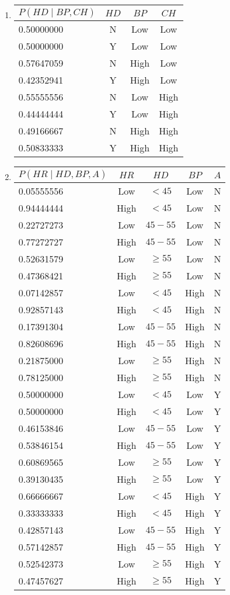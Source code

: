\documentclass[12pt]{article}
\begin{document}
\begin{enumerate}
\begin{enumerate}
\item

\begin{tabular}{lccc}
$P(HD\mid BP,CH)$ & $HD$ & $BP$ & $CH$ \\ \hline
0.50000000 & N & Low & Low \\
0.50000000 & Y & Low & Low \\
0.57647059 & N & High & Low \\
0.42352941 & Y & High & Low \\
0.55555556 & N & Low & High \\
0.44444444 & Y & Low & High \\
0.49166667 & N & High & High \\
0.50833333 & Y & High & High \\ 
\end{tabular}
  
\item
\begin{tabular}{lcccc}
$P(HR\mid HD,BP,A)$ & $HR$ & $HD$ & $BP$ & $A$ \\ \hline
0.05555556 & Low & $< 45$ & Low & N \\
0.94444444 & High & $< 45$ & Low & N \\
0.22727273 & Low & $45-55$ & Low & N \\
0.77272727 & High & $45-55$ & Low & N \\
0.52631579 & Low & $\geq 55$ & Low & N \\
0.47368421 & High & $\geq 55$ & Low & N \\
0.07142857 & Low & $< 45$ & High & N \\
0.92857143 & High & $< 45$ & High & N \\
0.17391304 & Low & $45-55$ & High & N \\
0.82608696 & High & $45-55$ & High & N \\
0.21875000 & Low & $\geq 55$ & High & N \\
0.78125000 & High & $\geq 55$ & High & N \\
0.50000000 & Low & $< 45$ & Low & Y \\
0.50000000 & High & $< 45$ & Low & Y \\
0.46153846 & Low & $45-55$ & Low & Y \\
0.53846154 & High & $45-55$ & Low & Y \\
0.60869565 & Low & $\geq 55$ & Low & Y \\
0.39130435 & High & $\geq 55$ & Low & Y \\
0.66666667 & Low & $< 45$ & High & Y \\
0.33333333 & High & $< 45$ & High & Y \\
0.42857143 & Low & $45-55$ & High & Y \\
0.57142857 & High & $45-55$ & High & Y \\
0.52542373 & Low & $\geq 55$ & High & Y \\
0.47457627 & High & $\geq 55$ & High & Y \\
\end{tabular}
\end{enumerate}


\end{enumerate}
\end{document}
